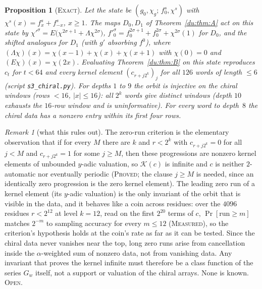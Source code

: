 \documentclass[11pt]{article}
\newtheorem{proposition}[theorem]{Proposition}
\theoremstyle{definition}
\theoremstyle{remark}
\newtheorem{remark}[theorem]{Remark}
\newcommand{\PROVED}{\textsc{Proved}}
\newcommand{\EXACT}{\textsc{Exact}}
\newcommand{\MEASURED}{\textsc{Measured}}
\newcommand{\OPEN}{\textsc{Open}}
\begin{document}
\begin{proposition}[\EXACT]\label{du:chiralcheck}
Let the state be $(g_0,\chi_g;\,f^s_0,\chi^s)$ with $\chi^s(x)=f^s_x+f^s_{-x}$, $x\ge1$. The maps $D_0,D_1$ of Theorem~\ref{du:thm:A} act on this state by
$\chi'^{\sigma}=E\bigl(\chi^{2\sigma+1}+\Lambda\chi^{2\sigma}\bigr)$, $f'^{\sigma}_0=f^{2\sigma+1}_0+f^{2\sigma}_0+\chi^{2\sigma}(1)$ for $D_0$, and the shifted analogues for $D_1$ (with $g'$ absorbing $f^0$), where $(\Lambda\chi)(x)=\chi(x-1)+\chi(x)+\chi(x+1)$ with $\chi(0)=0$ and $(E\chi)(x)=\chi(2x)$. Evaluating Theorem~\ref{du:thm:B} on this state reproduces $c_t$ for $t<64$ and every kernel element $(c_{r+j2^k})_j$ for all $126$ words of length $\le6$ (script \texttt{s3\_chiral.py}).
For depths $1$ to $9$ the orbit is injective on the chiral windows (rows $<16$, $|x|\le16$): all $2^k$ words give distinct windows (depth $10$ exhausts the $16$-row window and is uninformative). For every word to depth~$8$ the chiral data has a nonzero entry within its first four rows.
\end{proposition}

\begin{remark}[what this rules out]\label{du:zerorun}
The zero-run criterion is the elementary observation that if for every $M$ there are $k$ and $r<2^k$ with $c_{r+j2^k}=0$ for all $j<M$ and $c_{r+j2^k}=1$ for some $j\ge M$, then these progressions are nonzero kernel elements of unbounded $y$-adic valuation, so $\mathcal K(c)$ is infinite and $c$ is neither $2$-automatic nor eventually periodic (\PROVED; the clause $j\ge M$ is needed, since an identically zero progression is the zero kernel element). The leading zero run of a kernel element (its $y$-adic valuation) is the only invariant of the orbit that is visible in the data, and it behaves like a coin across residues: over the $4096$ residues $r<2^{12}$ at level $k=12$, read on the first $2^{20}$ terms of $c$, $\Pr[\text{run}\ge m]$ matches $2^{-m}$ to sampling accuracy for every $m\le12$ (\MEASURED), so the criterion's hypothesis holds at the coin's rate as far as it can be tested. Since the chiral data never vanishes near the top, long zero runs arise from cancellation inside the $\alpha$-weighted sum of nonzero data, not from vanishing data. Any invariant that proves the kernel infinite must therefore be a class function of the series $G_w$ itself, not a support or valuation of the chiral arrays. None is known. \OPEN.
\end{remark}
\end{document}
